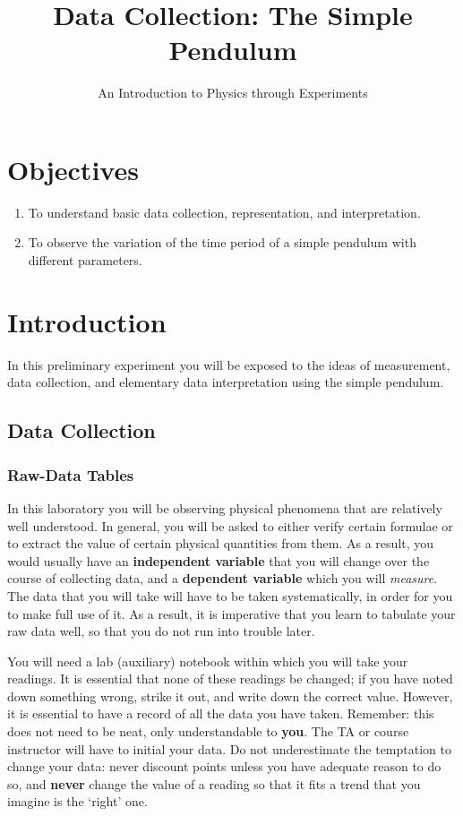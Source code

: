 \title{Data Collection: The Simple Pendulum}
\author{An Introduction to Physics through Experiments}
\date{}

\maketitle

\section{Objectives}

\begin{enumerate}
    \item To understand basic data collection, representation, and interpretation.
    \item To observe the variation of the time period of a simple pendulum with different parameters.
\end{enumerate}

\section{Introduction}

In this preliminary experiment you will be exposed to the ideas of measurement, data collection, and elementary data interpretation using the simple pendulum. 

\subsection{Data Collection}

\subsubsection{Raw-Data Tables}

In this laboratory you will be observing physical phenomena that are relatively well understood. In general, you will be asked to either verify certain formulae or to extract the value of certain physical quantities from them. As a result, you would usually have an \textbf{independent variable} that you will change over the course of collecting data, and a \textbf{dependent variable} which you will \textit{measure}. The data that you will take will have to be taken systematically, in order for you to make full use of it. As a result, it is imperative that you learn to tabulate your raw data well, so that you do not run into trouble later.

You will need a lab (auxiliary) notebook within which you will take your readings. It is essential that none of these readings be changed; if you have noted down something wrong, strike it out, and write down the correct value. However, it is essential to have a record of all the data you have taken. Remember: this does not need to be neat, only understandable to \textbf{you}. The TA or course instructor will have to initial your data. Do not underestimate the temptation to change your data: never discount points unless you have adequate reason to do so, and \textbf{never} change the value of a reading so that it fits a trend that you imagine is the `right' one.

